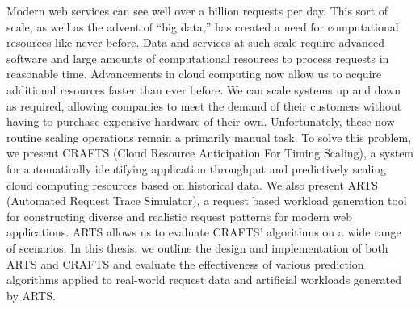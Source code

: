Modern web services can see well over a billion requests per day. This sort of scale, as well as the advent of ``big data,'' has created a need for computational resources like never before. Data and services at such scale require advanced software and large amounts of computational resources to process requests in reasonable time. Advancements in cloud computing now allow us to acquire additional resources faster than ever before. We can scale systems up and down as required, allowing companies to meet the demand of their customers without having to purchase expensive hardware of their own. Unfortunately, these now routine scaling operations remain a primarily manual task. To solve this problem, we present CRAFTS (Cloud Resource Anticipation For Timing Scaling), a system for automatically identifying application throughput and predictively scaling cloud computing resources based on historical data. We also present ARTS (Automated Request Trace Simulator), a request based workload generation tool for constructing diverse and realistic request patterns for modern web applications. ARTS allows us to evaluate CRAFTS' algorithms on a wide range of scenarios. In this thesis, we outline the design and implementation of both ARTS and CRAFTS and evaluate the effectiveness of various prediction algorithms applied to real-world request data and artificial workloads generated by ARTS.